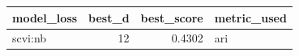 \begin{tabular}{lrrl}
\toprule
model\_loss & best\_d & best\_score & metric\_used \\
\midrule
scvi:nb & 12 & 0.4302 & ari \\
\bottomrule
\end{tabular}

